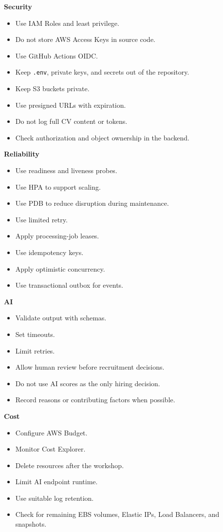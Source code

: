 \textbf{Security}

\begin{itemize}
\tightlist
\item
  Use IAM Roles and least privilege.
\item
  Do not store AWS Access Keys in source code.
\item
  Use GitHub Actions OIDC.
\item
  Keep \texttt{.\allowbreak{}env}, private keys, and secrets out of the repository.
\item
  Keep S3 buckets private.
\item
  Use presigned URLs with expiration.
\item
  Do not log full CV content or tokens.
\item
  Check authorization and object ownership in the backend.
\end{itemize}

\textbf{Reliability}

\begin{itemize}
\tightlist
\item
  Use readiness and liveness probes.
\item
  Use HPA to support scaling.
\item
  Use PDB to reduce disruption during maintenance.
\item
  Use limited retry.
\item
  Apply processing-job leases.
\item
  Use idempotency keys.
\item
  Apply optimistic concurrency.
\item
  Use transactional outbox for events.
\end{itemize}

\textbf{AI}

\begin{itemize}
\tightlist
\item
  Validate output with schemas.
\item
  Set timeouts.
\item
  Limit retries.
\item
  Allow human review before recruitment decisions.
\item
  Do not use AI scores as the only hiring decision.
\item
  Record reasons or contributing factors when possible.
\end{itemize}

\textbf{Cost}

\begin{itemize}
\tightlist
\item
  Configure AWS Budget.
\item
  Monitor Cost Explorer.
\item
  Delete resources after the workshop.
\item
  Limit AI endpoint runtime.
\item
  Use suitable log retention.
\item
  Check for remaining EBS volumes, Elastic IPs, Load Balancers, and
  snapshots.
\end{itemize}

